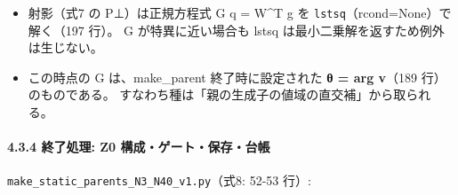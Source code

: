 \documentclass[
  a4paper,
]{ltjsarticle}
\providecommand{\tightlist}{%
  \setlength{\itemsep}{0pt}\setlength{\parskip}{0pt}}
\begin{document}
\begin{itemize}
\tightlist
\item
  射影（式7 の P⊥）は正規方程式 G q = W\^{}T g を
  \texttt{lstsq}（rcond=None）で解く（197 行）。 G が特異に近い場合も
  lstsq は最小二乗解を返すため例外は生じない。
\item
  この時点の G は、make\_parent 終了時に設定された \textbf{θ = arg
  v}（189 行）のものである。
  すなわち種は「親の生成子の値域の直交補」から取られる。
\end{itemize}

\paragraph{4.3.4 終了処理: Z0
構成・ゲート・保存・台帳}\label{ux7d42ux4e86ux51e6ux7406-z0-ux69cbux6210ux30b2ux30fcux30c8ux4fddux5b58ux53f0ux5e33}

\texttt{make\_static\_parents\_N3\_N40\_v1.py}（式8: 52-53 行）:
\end{document}
